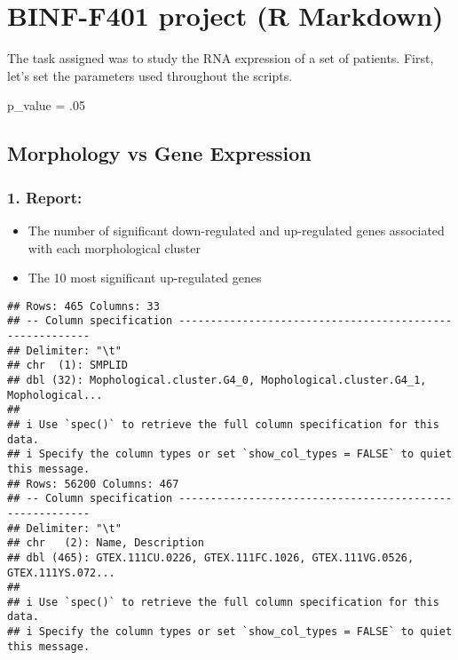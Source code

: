\documentclass[
]{article}
\newenvironment{Shaded}{\begin{snugshade}}{\end{snugshade}}
\newcommand{\DecValTok}[1]{\textcolor[rgb]{0.00,0.00,0.81}{#1}}
\newcommand{\NormalTok}[1]{#1}
\newcommand{\OtherTok}[1]{\textcolor[rgb]{0.56,0.35,0.01}{#1}}
\providecommand{\tightlist}{%
  \setlength{\itemsep}{0pt}\setlength{\parskip}{0pt}}
\begin{document}
\hypertarget{binf-f401-project-r-markdown}{%
\section{BINF-F401 project (R
Markdown)}\label{binf-f401-project-r-markdown}}

The task assigned was to study the RNA expression of a set of patients.
First, let's set the parameters used throughout the scripts.

\begin{Shaded}
\begin{Highlighting}[]
\NormalTok{  p\_value }\OtherTok{=}\NormalTok{ .}\DecValTok{05}
\end{Highlighting}
\end{Shaded}

\hypertarget{morphology-vs-gene-expression}{%
\subsection{Morphology vs Gene
Expression}\label{morphology-vs-gene-expression}}

\hypertarget{report}{%
\subsubsection{1. Report:}\label{report}}

\begin{itemize}
\tightlist
\item
  The number of significant down-regulated and up-regulated genes
  associated with each morphological cluster
\item
  The 10 most significant up-regulated genes
\end{itemize}

\begin{verbatim}
## Rows: 465 Columns: 33
## -- Column specification --------------------------------------------------------
## Delimiter: "\t"
## chr  (1): SMPLID
## dbl (32): Mophological.cluster.G4_0, Mophological.cluster.G4_1, Mophological...
## 
## i Use `spec()` to retrieve the full column specification for this data.
## i Specify the column types or set `show_col_types = FALSE` to quiet this message.
## Rows: 56200 Columns: 467
## -- Column specification --------------------------------------------------------
## Delimiter: "\t"
## chr   (2): Name, Description
## dbl (465): GTEX.111CU.0226, GTEX.111FC.1026, GTEX.111VG.0526, GTEX.111YS.072...
## 
## i Use `spec()` to retrieve the full column specification for this data.
## i Specify the column types or set `show_col_types = FALSE` to quiet this message.
\end{verbatim}
\end{document}
